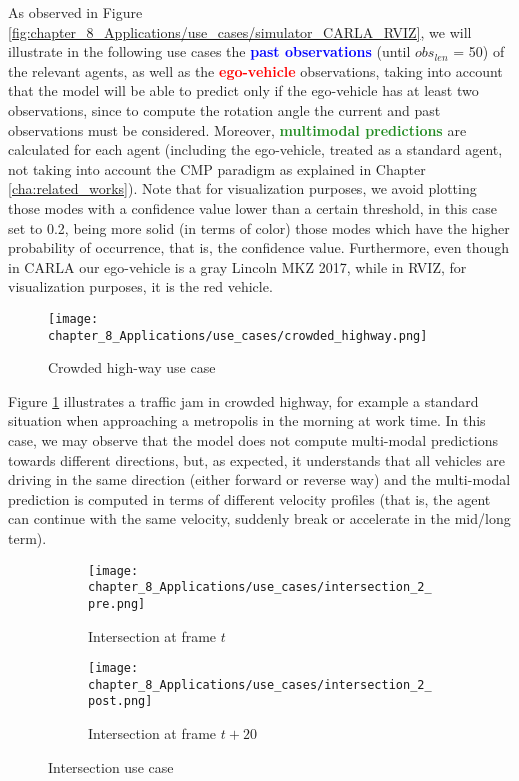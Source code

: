 As observed in Figure \ref{fig:chapter_8_Applications/use_cases/simulator_CARLA_RVIZ}, we will illustrate in the following use cases the \textbf{\textcolor{blue}{past observations}} (until \textit{$obs_{len}$} = 50) of the relevant agents, as well as the \textbf{\textcolor{red}{ego-vehicle}} observations, taking into account that the model will be able to predict only if the ego-vehicle has at least two observations, since to compute the rotation angle the current and past observations must be considered. Moreover, \textbf{\textcolor{ForestGreen}{multimodal predictions}} are calculated for each agent (including the ego-vehicle, treated as a standard agent, not taking into account the \ac{CMP} paradigm as explained in Chapter \ref{cha:related_works}). Note that for visualization purposes, we avoid plotting those modes with a confidence value lower than a certain threshold, in this case set to 0.2, being more solid (in terms of color) those modes which have the higher probability of occurrence, that is, the confidence value. Furthermore, even though in \ac{CARLA} our ego-vehicle is a gray Lincoln MKZ 2017, while in \ac{RVIZ}, for visualization purposes, it is the red vehicle.

\begin{figure}[!h]
	\centering
	\texttt{[image: chapter\_8\_Applications/use\_cases/crowded\_highway.png]}
	\caption{Crowded high-way use case}
	\label{fig:chapter_8_Applications/use_cases/crowded_highway}
\end{figure}

Figure \ref{fig:chapter_8_Applications/use_cases/crowded_highway} illustrates a traffic jam in crowded highway, for example a standard situation when approaching a metropolis in the morning at work time. In this case, we may observe that the model does not compute multi-modal predictions towards different directions, but, as expected, it understands that all vehicles are driving in the same direction (either forward or reverse way) and the multi-modal prediction is computed in terms of different velocity profiles (that is, the agent can continue with the same velocity, suddenly break or accelerate in the mid/long term).

\begin{figure}[!h]
	\begin{subfigure}{\textwidth}
		\texttt{[image: chapter\_8\_Applications/use\_cases/intersection\_2\_pre.png]}
		\label{subfig:chapter_8_Applications/use_cases/intersection_2_pre}
		\caption{Intersection at frame $t$}
	\end{subfigure}
	\begin{subfigure}{\textwidth}
		\texttt{[image: chapter\_8\_Applications/use\_cases/intersection\_2\_post.png]}
		\label{subfig:chapter_8_Applications/use_cases/intersection_2_post}
		\caption{Intersection at frame $t+20$}
	\end{subfigure}
	
	\caption{Intersection use case}
	\label{fig:chapter_8_Applications/use_cases/intersection}
\end{figure}

